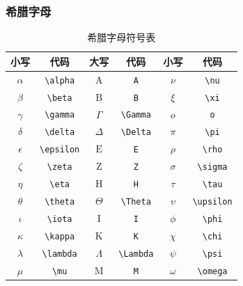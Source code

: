 \documentclass{article}
\begin{document}
\subsubsection{希腊字母}
\begin{table}[H]
    \centering
    \begin{tabular}{|c|c|c|c|c|c|}
        \hline
        小写         & 代码              & 大写           & 代码             & 小写         & 代码              \\
        \hline
        $\alpha$   & \verb|\alpha|   & $\mathrm{A}$ & \verb|A|       & $\nu$      & \verb|\nu|      \\
        $\beta$    & \verb|\beta|    & $\mathrm{B}$ & \verb|B|       & $\xi$      & \verb|\xi|      \\
        $\gamma$   & \verb|\gamma|   & $\Gamma$     & \verb|\Gamma|  & $o$        & \verb|o|        \\
        $\delta$   & \verb|\delta|   & $\Delta$     & \verb|\Delta|  & $\pi$      & \verb|\pi|      \\
        $\epsilon$ & \verb|\epsilon| & $\mathrm{E}$ & \verb|E|       & $\rho$     & \verb|\rho|     \\
        $\zeta$    & \verb|\zeta|    & $\mathrm{Z}$ & \verb|Z|       & $\sigma$   & \verb|\sigma|   \\
        $\eta$     & \verb|\eta|     & $\mathrm{H}$ & \verb|H|       & $\tau$     & \verb|\tau|     \\
        $\theta$   & \verb|\theta|   & $\Theta$     & \verb|\Theta|  & $\upsilon$ & \verb|\upsilon| \\
        $\iota$    & \verb|\iota|    & $\mathrm{I}$ & \verb|I|       & $\phi$     & \verb|\phi|     \\
        $\kappa$   & \verb|\kappa|   & $\mathrm{K}$ & \verb|K|       & $\chi$     & \verb|\chi|     \\
        $\lambda$  & \verb|\lambda|  & $\Lambda$    & \verb|\Lambda| & $\psi$     & \verb|\psi|     \\
        $\mu$      & \verb|\mu|      & $\mathrm{M}$ & \verb|M|       & $\omega$   & \verb|\omega|   \\
        \hline
    \end{tabular}
    \caption{希腊字母符号表}
\end{table}
\end{document}
